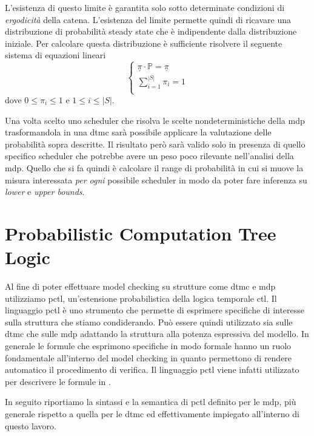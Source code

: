 L'esistenza di questo limite è garantita solo sotto determinate condizioni di \emph{ergodicità} della catena. L'esistenza del limite permette quindi di ricavare una distribuzione di probabilità steady state che è indipendente dalla distribuzione iniziale. Per calcolare questa distribuzione è sufficiente risolvere il seguente sistema di equazioni lineari
$$
\left\{
\begin{array}{l}
\underline\pi \cdot \mathbb{P} = \underline\pi \\
\sum^{|S|}_{i=1} \pi_i = 1 \\
\end{array}
\right.
$$
dove $0 \leq \pi_i \leq 1$ e $1 \leq i \leq |S|$.

Una volta scelto uno scheduler che risolva le scelte nondeterministiche della \ac{mdp} trasformandola in una \ac{dtmc} sarà possibile applicare la valutazione delle probabilità sopra descritte. Il risultato però sarà valido solo in presenza di quello specifico scheduler che potrebbe avere un peso poco rilevante nell'analisi della \ac{mdp}. Quello che si fa quindi è calcolare il range di probabilità in cui si muove la misura interessata \emph{per ogni} possibile scheduler in modo da poter fare inferenza su \emph{lower} e \emph{upper bounds}.

\section{Probabilistic Computation Tree Logic}
Al fine di poter effettuare model checking su strutture come \ac{dtmc} e \ac{mdp} utilizziamo \ac{pctl}, un'estensione probabilistica della logica temporale \ac{ctl}. Il linguaggio \ac{pctl} è uno strumento che permette di esprimere specifiche di interesse sulla struttura che stiamo condiderando. Può essere quindi utilizzato sia sulle \ac{dtmc} che sulle \ac{mdp} adattando la struttura alla potenza espressiva del modello. In generale le formule che esprimono specifiche in modo formale hanno un ruolo fondamentale all'interno del model checking in quanto permettono di rendere automatico il procedimento di verifica. Il linguaggio \ac{pctl} viene infatti utilizzato per descrivere le formule in \prism{}.

In seguito riportiamo la sintassi e la semantica di \ac{pctl} definito per le \ac{mdp}, più generale rispetto a quella per le \ac{dtmc} ed effettivamente impiegato all'interno di questo lavoro.

